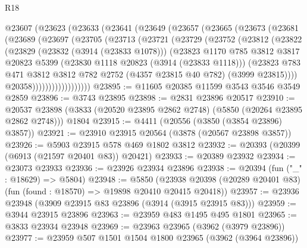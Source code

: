 \begin{lexlean}{R18}
\begin{coremodule}
    @23607
      (@23623
        (@23633
          (@23641
            (@23649
              (@23657
                (@23665
                  (@23673
                    (@23681
                      (@23689
                        (@23697
                          (@23705
                            (@23713
                              (@23721
                                (@23729
                                  (@23752
                                    (@23812
                                      (@23822
                                        (@23829
                                          (@23832 (@3914 (@23833 @1078)))
                                          (@23823
                                            @1170
                                            @785
                                            @3812
                                            @3817
                                            @20823
                                            @5399
                                            (@23830 @1118 @20823 (@3914 (@23833 @1118)))
                                            (@23823
                                              @783
                                              @471
                                              @3812
                                              @3812
                                              @782
                                              @2752
                                              (@4357 @23815 @40 @782)
                                              (@3999 @23815))))
                                        @20358))))))))))))))))))
@23895 := @11605 @20385 @11599 @3543 @3546 @3549 @2859
@23896 := @3743 @23895
@23898 := @2831 @23896 @20517
@23910 := @20537
    @23898
    (@3833 (@20520 @23895 @2862 @2748) (@5850 (@20264 @23895 @2862 @2748)))
    @1804
@23915 := @4411 (@20556 (@3850 (@3854 @23896) @3857))
@23921 := @23910 @23915 @20564 (@3878 (@20567 @23898 @3857))
@23926 := @5903 @23915 @578 @469 @1802 @3812
@23932 := @20393 (@20399 (@6913 (@21597 @20401 @83)) @20421)
@23933 := @20389 @23932
@23934 := @23073 @23933
@23936 := @23926 @23934 @23896
@23938 := @20394 (fun ("_" : @18629) => @5804)
@23948 := @5850
    (@23938 @20398 (@20289 @20401 @83) (fun (found : @18570) => @19898 @20410 @20415 @20418))
@23957 := @23936 @23948 (@3909 @23915 @83 @23896 (@3914 (@3915 @23915 @83)))
@23959 := @3944 @23915 @23896
@23963 := @23959 @483 @1495 @495 @1801
@23965 := @3833 @23934 @23948
@23969 := @23963 @23965 (@3962 (@3979 @23896))
@23977 := @23959 @507 @1501 @1504 @1800 @23965 (@3962 (@3964 @23896))

\end{coremodule}
\end{lexlean}
